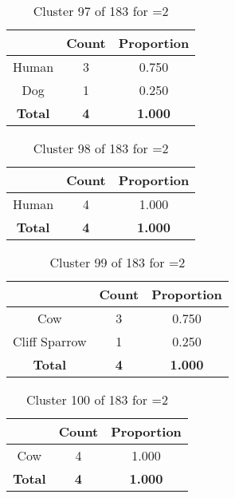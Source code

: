 \begin{table}[ht!]
\centering
\begin{tabular}{|c|c|c|}
\hline
\bf \Spec{} &\bf Count &\bf Proportion\\ \hline \hline
Human & 3 & 0.750\\ \hline
Dog & 1 & 0.250\\ \hline
\hline
\bf Total & \bf 4 & \bf 1.000\\ \hline
\end{tabular}
\label{tab:cluster:97:2}
\caption{Cluster 97 of 183 for \minneigh{}=2}
\end{table}

\begin{table}[ht!]
\centering
\begin{tabular}{|c|c|c|}
\hline
\bf \Spec{} &\bf Count &\bf Proportion\\ \hline \hline
Human & 4 & 1.000\\ \hline
\hline
\bf Total & \bf 4 & \bf 1.000\\ \hline
\end{tabular}
\label{tab:cluster:98:2}
\caption{Cluster 98 of 183 for \minneigh{}=2}
\end{table}

\begin{table}[ht!]
\centering
\begin{tabular}{|c|c|c|}
\hline
\bf \Spec{} &\bf Count &\bf Proportion\\ \hline \hline
Cow & 3 & 0.750\\ \hline
Cliff Sparrow & 1 & 0.250\\ \hline
\hline
\bf Total & \bf 4 & \bf 1.000\\ \hline
\end{tabular}
\label{tab:cluster:99:2}
\caption{Cluster 99 of 183 for \minneigh{}=2}
\end{table}

\clearpage
\begin{table}[ht!]
\centering
\begin{tabular}{|c|c|c|}
\hline
\bf \Spec{} &\bf Count &\bf Proportion\\ \hline \hline
Cow & 4 & 1.000\\ \hline
\hline
\bf Total & \bf 4 & \bf 1.000\\ \hline
\end{tabular}
\label{tab:cluster:100:2}
\caption{Cluster 100 of 183 for \minneigh{}=2}
\end{table}

